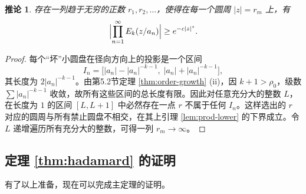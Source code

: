 \documentclass[UTF8]{ctexart}
\newtheorem{corollary}[theorem]{推论}
\numberwithin{equation}{section}
\begin{document}
\begin{corollary}\label{cor:good-radii}
存在一列趋于无穷的正数 \(r_1, r_2, \dots\)，使得在每一个圆周 \(|z| = r_m\) 上，有
\[
\Bigl| \prod_{n=1}^\infty E_k(z/a_n) \Bigr| \ge e^{-c |z|^s}.
\]
\end{corollary}

\begin{proof}
每个“坏”小圆盘在径向方向上的投影是一个区间
\[
I_n = \bigl[ |a_n| - |a_n|^{-k-1},\; |a_n| + |a_n|^{-k-1} \bigr],
\]
其长度为 \(2|a_n|^{-k-1}\)。由第5.2节定理 \ref{thm:order-growth} (ii)，因 \(k+1 > \rho_0\)，级数 \(\sum |a_n|^{-k-1}\) 收敛，故所有这些区间的总长度有限。因此对任意充分大的整数 \(L\)，在长度为 \(1\) 的区间 \([L, L+1]\) 中必然存在一点 \(r\) 不属于任何 \(I_n\)。这样选出的 \(r\) 对应的圆周与所有禁止圆盘不相交，在其上引理 \ref{lem:prod-lower} 的下界成立。令 \(L\) 递增遍历所有充分大的整数，可得一列 \(r_m \to \infty\)。
\end{proof}

\subsection{定理 \ref{thm:hadamard} 的证明}

有了以上准备，现在可以完成主定理的证明。
\end{document}
